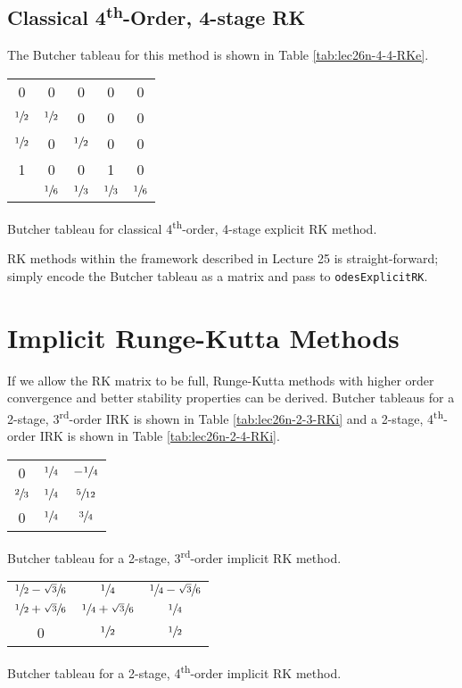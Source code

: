 \subsection{Classical 4\textsuperscript{th}-Order, 4-stage RK}
The Butcher tableau for this method is shown in Table \ref{tab:lec26n-4-4-RKe}.
\begin{margintable}
\begin{tabular}{c|cccc}
0 & 0 & 0 & 0 & 0 \\
$\sfrac{1}{2}$ & $\sfrac{1}{2}$ & 0 & 0 & 0 \\
$\sfrac{1}{2}$ & 0 & $\sfrac{1}{2}$ & 0 & 0 \\
1 & 0 & 0 & 1 & 0 \\ \hline
  & $\sfrac{1}{6}$ & $\sfrac{1}{3}$ & $\sfrac{1}{3}$ & $\sfrac{1}{6}$
\end{tabular}
\caption{Butcher tableau for classical 4\textsuperscript{th}-order, 4-stage explicit RK method.}
\label{tab:lec26n-4-4-RKe}
\end{margintable} 

 RK methods within the framework described in Lecture 25 is straight-forward; simply encode the Butcher tableau as a matrix and pass to \lstinline[style=myMatlab]{odesExplicitRK}.
\section{Implicit Runge-Kutta Methods}

If we allow the RK matrix to be full, Runge-Kutta methods with higher order convergence and better stability properties can be derived. Butcher tableaus for a 2-stage, 3\textsuperscript{rd}-order IRK is shown in Table \ref{tab:lec26n-2-3-RKi} and a 2-stage, 4\textsuperscript{th}-order IRK is shown in Table \ref{tab:lec26n-2-4-RKi}.

\begin{margintable}
\begin{tabular}{c|cc}
0 & $\sfrac{1}{4}$ & $-\sfrac{1}{4}$ \\
$\sfrac{2}{3}$ & $\sfrac{1}{4}$ & $\sfrac{5}{12}$ \\ \hline
0 & $\sfrac{1}{4}$ & $\sfrac{3}{4}$ 
\end{tabular}
\caption{Butcher tableau for a 2-stage, 3\textsuperscript{rd}-order implicit RK method.}
\label{tab:lec26n-2-3-RKi}
\end{margintable}

\begin{margintable}
\begin{tabular}{c|cc}
$\sfrac{1}{2}-\sfrac{\sqrt{3}}{6}$ & $\sfrac{1}{4}$ & $\sfrac{1}{4}-\sfrac{\sqrt{3}}{6}$ \\
$\sfrac{1}{2}+\sfrac{\sqrt{3}}{6}$ & $\sfrac{1}{4}+\sfrac{\sqrt{3}}{6}$ & $\sfrac{1}{4}$ \\ \hline
0 & $\sfrac{1}{2}$ & $\sfrac{1}{2}$
\end{tabular}
\caption{Butcher tableau for a 2-stage, 4\textsuperscript{th}-order implicit RK method.}
\label{tab:lec26n-2-4-RKi}
\end{margintable}

